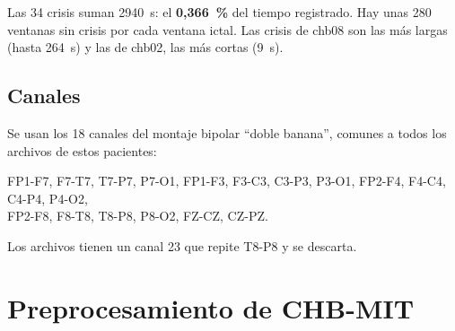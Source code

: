 Las 34 crisis suman 2940~s: el \textbf{0,366~\%} del tiempo registrado. Hay unas 280 ventanas sin crisis por
cada ventana ictal. Las crisis de chb08 son las más largas (hasta 264~s) y las de chb02, las más cortas (9~s).

\subsection{Canales}

Se usan los 18 canales del montaje bipolar ``doble banana'', comunes a todos los archivos de estos pacientes:
\begin{center}
\small
FP1-F7, F7-T7, T7-P7, P7-O1, FP1-F3, F3-C3, C3-P3, P3-O1, FP2-F4, F4-C4, C4-P4, P4-O2,\\
FP2-F8, F8-T8, T8-P8, P8-O2, FZ-CZ, CZ-PZ.
\end{center}
Los archivos tienen un canal 23 que repite T8-P8 y se descarta.

\section{Preprocesamiento de CHB-MIT}
\label{sec:preproc}

